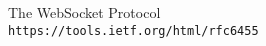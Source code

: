 \begin{thebibliography}{9}

The WebSocket Protocol
\\\texttt{https://tools.ietf.org/html/rfc6455}


\end{thebibliography}
